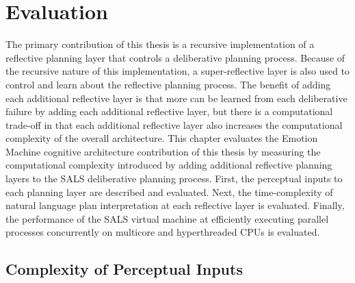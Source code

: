 \chapter{Evaluation}
\label{chapter:evaluation}

The primary contribution of this thesis is a recursive implementation
of a reflective planning layer that controls a deliberative planning
process.  Because of the recursive nature of this implementation, a
super-reflective layer is also used to control and learn about the
reflective planning process.  The benefit of adding each additional
reflective layer is that more can be learned from each deliberative
failure by adding each additional reflective layer, but there is a
computational trade-off in that each additional reflective layer also
increases the computational complexity of the overall architecture.
This chapter evaluates the Emotion Machine cognitive architecture
contribution of this thesis by measuring the computational complexity
introduced by adding additional reflective planning layers to the SALS
deliberative planning process.  First, the perceptual inputs to each
planning layer are described and evaluated.  Next, the time-complexity
of natural language plan interpretation at each reflective layer is
evaluated.  Finally, the performance of the SALS virtual machine at
efficiently executing parallel processes concurrently on multicore and
hyperthreaded CPUs is evaluated.

\section{Complexity of Perceptual Inputs}

